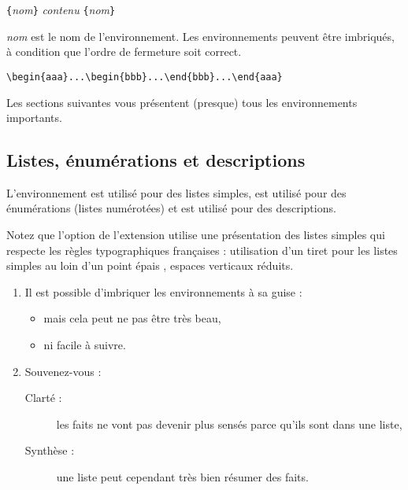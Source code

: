 \begin{lscommand}
\verb|{|\emph{nom}\verb|}|\quad
   \emph{contenu}\quad
{}\verb|{|\emph{nom}\verb|}|
\end{lscommand}
\noindent
\emph{nom} est le nom de l'environnement. Les environnements peuvent
être imbriqués, à condition que l'ordre de fermeture soit correct.
\begin{code}
\verb|\begin{aaa}...\begin{bbb}...\end{bbb}...\end{aaa}|
\end{code}
\noindent Les sections suivantes vous présentent (presque) tous les
environnements importants.

\subsection{Listes, énumérations et descriptions}

L'environnement  est utilisé pour des listes simples,
 est utilisé pour des énumérations (listes
numérotées) et  est utilisé pour des descriptions.


Notez que l'option  de l'extension  utilise
une présentation des
listes simples qui respecte les règles typographiques françaises : utilisation
d'un tiret pour les listes simples au loin d'un point épais \og \textbullet
\fg, espaces verticaux réduits.

\begin{example}
\begin{enumerate}
\item Il est possible d'imbriquer
les environnements à sa guise :
\begin{itemize}
\item mais cela peut ne pas
  être  très beau,
\item ni facile à suivre.
\end{itemize}
\item Souvenez-vous :
\begin{description}
\item[Clarté :] les faits ne
vont pas devenir plus sensés
parce  qu'ils sont dans une liste,
\item[Synthèse :] une liste peut
cependant très bien
résumer des faits.
\end{description}
\end{enumerate}
\end{example}

